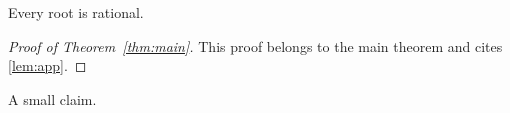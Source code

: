 \begin{conjecture}\label{conj:strong}
Every root is rational.
\end{conjecture}
\begin{proof}[Proof of Theorem~\ref{thm:main}]
This proof belongs to the main theorem and cites \ref{lem:app}.
\end{proof}
\begin{claim}
A small claim.
\end{claim}
